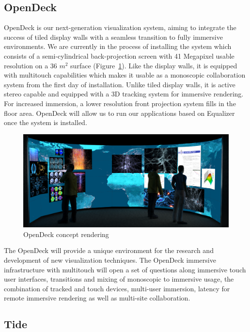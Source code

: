 \documentclass[10pt]{llncs}
\newcommand{\fig}[1]{Figure~\ref{#1}}
\begin{document}
\subsection{OpenDeck}

OpenDeck is our next-generation visualization system, aiming to integrate the
success of tiled display walls with a seamless transition to fully immersive
environments. We are currently in the process of installing the system which
consists of a semi-cylindrical back-projection screen with 41 Megapixel usable
resolution on a 36 $m^2$ surface (\fig{fOpenDeck}). Like the display walls, it
is equipped with multitouch capabilities which makes it usable as a monoscopic
collaboration system from the first day of installation. Unlike tiled display
walls, it is active stereo capable and equipped with a 3D tracking system for
immersive rendering. For increased immersion, a lower resolution front
projection system fills in the floor area. OpenDeck will allow us to run our
applications based on Equalizer~\cite{EMP:09} once the system is installed.

\begin{figure}[h!t]
  \includegraphics[width=\columnwidth]{images/opendeck}
  \caption{\label{fOpenDeck}OpenDeck concept rendering}
\end{figure}

The OpenDeck will provide a unique environment for the research and development
of new visualization techniques. The OpenDeck immersive infrastructure with
multitouch will open a set of questions along immersive touch user interfaces,
transitions and mixing of monoscopic to immersive usage, the combination of
tracked and touch devices, multi-user immersion, latency for remote immersive
rendering as well as multi-site collaboration.

\subsection{Tide}
\end{document}
